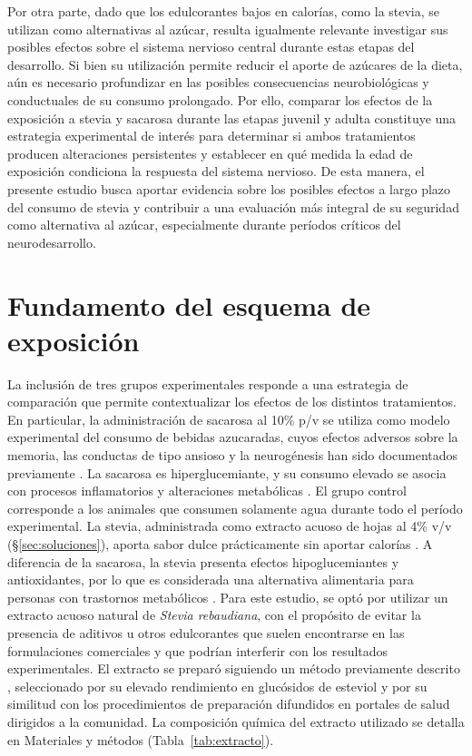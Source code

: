 Por otra parte, dado que los edulcorantes bajos en calorías, como la stevia, se utilizan como alternativas al azúcar, resulta igualmente relevante investigar sus posibles efectos sobre el sistema nervioso central durante estas etapas del desarrollo. Si bien su utilización permite reducir el aporte de azúcares de la dieta, aún es necesario profundizar en las posibles consecuencias neurobiológicas y conductuales de su consumo prolongado. Por ello, comparar los efectos de la exposición a stevia y sacarosa durante las etapas juvenil y adulta constituye una estrategia experimental de interés para determinar si ambos tratamientos producen alteraciones persistentes y establecer en qué medida la edad de exposición condiciona la respuesta del sistema nervioso. De esta manera, el presente estudio busca aportar evidencia sobre los posibles efectos a largo plazo del consumo de stevia y contribuir a una evaluación más integral de su seguridad como alternativa al azúcar, especialmente durante períodos críticos del neurodesarrollo.

\section{Fundamento del esquema de exposición}\label{sec:bases}

La inclusión de tres grupos experimentales responde a una estrategia de comparación que permite contextualizar los efectos de los distintos tratamientos. En particular, la administración de sacarosa al 10\% p/v se utiliza como modelo experimental del consumo de bebidas azucaradas, cuyos efectos adversos sobre la memoria, las conductas de tipo ansioso y la neurogénesis han sido documentados previamente \cite{reichelt2016sucrose,coirini2022sucrose,kruse2019sucrose}. La sacarosa es hiperglucemiante, y su consumo elevado se asocia con procesos inflamatorios y alteraciones metabólicas \cite{anton2010stevia,vos2017sugars,hsu2015sucrose}. El grupo control corresponde a los animales que consumen solamente agua durante todo el período experimental. La stevia, administrada como extracto acuoso de hojas al 4\% v/v (\S\ref{sec:soluciones}), aporta sabor dulce prácticamente sin aportar calorías \cite{chatsudthipong2009stevioside}. A diferencia de la sacarosa, la stevia presenta efectos hipoglucemiantes y antioxidantes, por lo que es considerada una alternativa alimentaria para personas con trastornos metabólicos \cite{anton2010stevia,chatsudthipong2009stevioside,gregersen2004stevioside,prata2017glycosides}. Para este estudio, se optó por utilizar un extracto acuoso natural de \textit{Stevia rebaudiana}, con el propósito de evitar la presencia de aditivos u otros edulcorantes que suelen encontrarse en las formulaciones comerciales y que podrían interferir con los resultados experimentales. El extracto se preparó siguiendo un método previamente descrito \cite{kruse2025stevia,sharma2009stevia}, seleccionado por su elevado rendimiento en glucósidos de esteviol \cite{celaya2022infusions} y por su similitud con los procedimientos de preparación difundidos en portales de salud dirigidos a la comunidad. La composición química del extracto utilizado se detalla en Materiales y métodos (Tabla~\ref{tab:extracto}).

